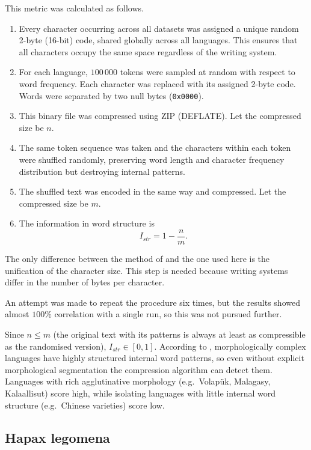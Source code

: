 This metric was calculated as follows.
\begin{enumerate}
    \item Every character occurring across all datasets was assigned a unique random 2-byte (16-bit) code, shared globally across all languages. This ensures that all characters occupy the same space regardless of the writing system.
    \item For each language, $100\,000$ tokens were sampled at random with respect to word frequency. Each character was replaced with its assigned 2-byte code. Words were separated by two null bytes (\texttt{0x0000}).
    \item This binary file was compressed using ZIP (DEFLATE). Let the compressed size be $n$.
    \item The same token sequence was taken and the characters within each token were shuffled randomly, preserving word length and character frequency distribution but destroying internal patterns.
    \item The shuffled text was encoded in the same way and compressed. Let the compressed size be $m$.
    \item The information in word structure is
$$
I_{str}=1-\frac{n}{m}.
$$
\end{enumerate}

The only difference between the method of \textcite{Coltekin2022} and the one used here is the unification of the character size. This step is needed because writing systems differ in the number of bytes per character.

An attempt was made to repeat the procedure six times, but the results showed almost $100\%$ correlation with a single run, so this was not pursued further.

Since $n \leq m$ (the original text with its patterns is always at least as compressible as the randomised version), $I_{str} \in [0, 1]$. According to \textcite{Coltekin2022}, morphologically complex languages have highly structured internal word patterns, so even without explicit morphological segmentation the compression algorithm can detect them. Languages with rich agglutinative morphology (e.g.\ Volapük, Malagasy, Kalaallisut) score high, while isolating languages with little internal word structure (e.g.\ Chinese varieties) score low.

\subsection{Hapax legomena}
\parencite{Milicka2022}

